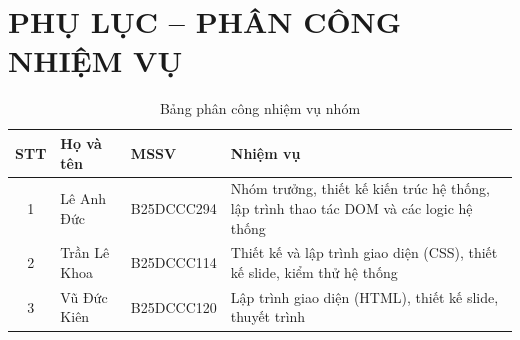 \documentclass[12pt,a4paper]{article}
\begin{document}
\section*{PHỤ LỤC -- PHÂN CÔNG NHIỆM VỤ}

\begin{table}[H]
\centering
\caption{Bảng phân công nhiệm vụ nhóm}
\begin{tabularx}{\textwidth}{|c|l|l|X|}
\hline
\textbf{STT} & \textbf{Họ và tên} & \textbf{MSSV} & \textbf{Nhiệm vụ} \\
\hline
1 & Lê Anh Đức   & B25DCCC294 & Nhóm trưởng, thiết kế kiến trúc hệ thống, lập trình thao tác DOM và các logic hệ thống\\
\hline
2 & Trần Lê Khoa & B25DCCC114  & Thiết kế và lập trình giao diện (CSS), thiết kế slide, kiểm thử hệ thống \\
\hline
3 & Vũ Đức Kiên  & B25DCCC120 & Lập trình giao diện (HTML), thiết kế slide, thuyết trình\\
\hline
\end{tabularx}
\end{table}
\end{document}
